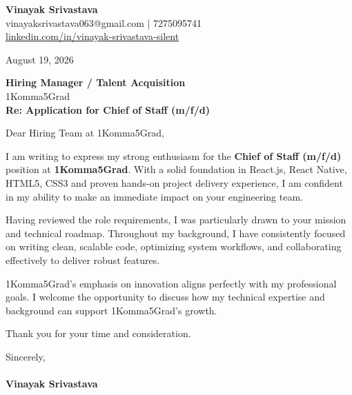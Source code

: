 \documentclass[11pt,a4paper]{article}
\begin{document}
\thispagestyle{empty}

{\Large \textbf{Vinayak Srivastava}}\\
vinayaksrivastava063@gmail.com | 7275095741 \\
\url{linkedin.com/in/vinayak-srivastava-silent}

\vspace{1em}
\hfill August 19, 2026

\textbf{Hiring Manager / Talent Acquisition}\\
1Komma5Grad\\

\vspace{1.5em}
\textbf{Re: Application for Chief of Staff (m/f/d)}

\vspace{1em}
Dear Hiring Team at 1Komma5Grad,

I am writing to express my strong enthusiasm for the \textbf{Chief of Staff (m/f/d)} position at \textbf{1Komma5Grad}. With a solid foundation in React.js, React Native, HTML5, CSS3 and proven hands-on project delivery experience, I am confident in my ability to make an immediate impact on your engineering team.

Having reviewed the role requirements, I was particularly drawn to your mission and technical roadmap. Throughout my background, I have consistently focused on writing clean, scalable code, optimizing system workflows, and collaborating effectively to deliver robust features.

1Komma5Grad's emphasis on innovation aligns perfectly with my professional goals. I welcome the opportunity to discuss how my technical expertise and background can support 1Komma5Grad's growth.

Thank you for your time and consideration.

\vspace{1.5em}
Sincerely,\\
\vspace{1em}\\
\textbf{Vinayak Srivastava}
\end{document}
